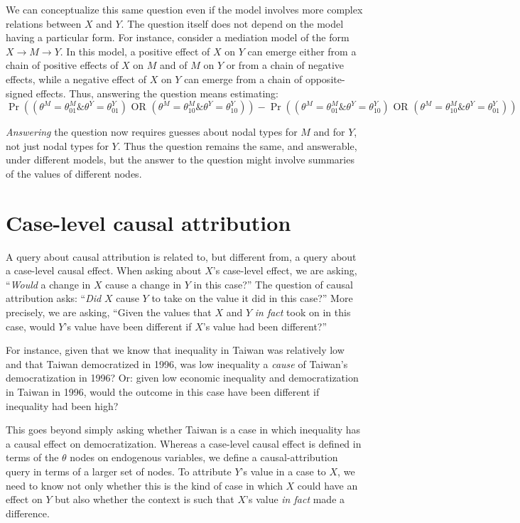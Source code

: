\documentclass[
  12pt,
]{book}
\begin{document}
We can conceptualize this same question even if the model involves more complex relations between \(X\) and \(Y\). The question itself does not depend on the model having a particular form. For instance, consider a mediation model of the form \(X\rightarrow M \rightarrow Y\). In this model, a positive effect of \(X\) on \(Y\) can emerge either from a chain of positive effects of \(X\) on \(M\) and of \(M\) on \(Y\) or from a chain of negative effects, while a negative effect of \(X\) on \(Y\) can emerge from a chain of opposite-signed effects. Thus, answering the question means estimating:
\[\Pr((\theta^M = \theta^M_{01} \& \theta^Y = \theta^Y_{01})  \text{ OR }  (\theta^M = \theta^M_{10} \& \theta^Y = \theta^Y_{10}))   - \Pr((\theta^M = \theta^M_{01} \& \theta^Y = \theta^Y_{10})  \text{ OR }  (\theta^M = \theta^M_{10} \& \theta^Y = \theta^Y_{01}))\]

\emph{Answering} the question now requires guesses about nodal types for \(M\) and for \(Y\), not just nodal types for \(Y\). Thus the question remains the same, and answerable, under different models, but the answer to the question might involve summaries of the values of different nodes.

\hypertarget{case-level-causal-attribution}{%
\section{Case-level causal attribution}\label{case-level-causal-attribution}}

A query about causal attribution is related to, but different from, a query about a case-level causal effect. When asking about \(X\)'s case-level effect, we are asking, ``\emph{Would} a change in \(X\) cause a change in \(Y\) in this case?'' The question of causal attribution asks: ``\emph{Did} \(X\) cause \(Y\) to take on the value it did in this case?'' More precisely, we are asking, ``Given the values that \(X\) and \(Y\) \emph{in fact} took on in this case, would \(Y\)'s value have been different if \(X\)'s value had been different?''

For instance, given that we know that inequality in Taiwan was relatively low and that Taiwan democratized in 1996, was low inequality a \emph{cause} of Taiwan's democratization in 1996? Or: given low economic inequality and democratization in Taiwan in 1996, would the outcome in this case have been different if inequality had been high?

This goes beyond simply asking whether Taiwan is a case in which inequality has a causal effect on democratization. Whereas a case-level causal effect is defined in terms of the \(\theta\) nodes on endogenous variables, we define a causal-attribution query in terms of a larger set of nodes. To attribute \(Y\)'s value in a case to \(X\), we need to know not only whether this is the kind of case in which \(X\) could have an effect on \(Y\) but also whether the context is such that \(X\)'s value \emph{in fact} made a difference.
\end{document}
